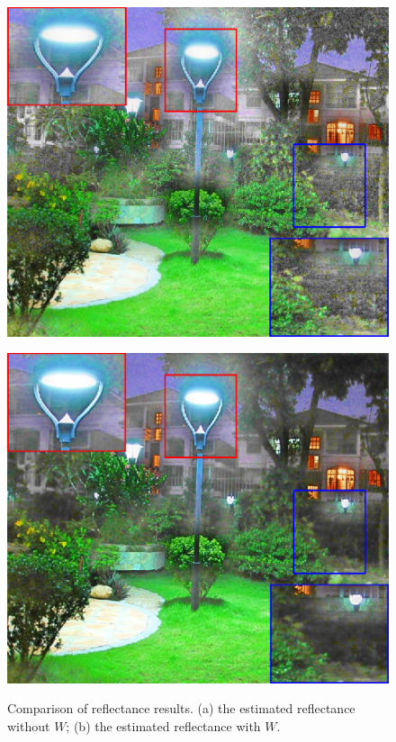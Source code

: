 \begin{figure}[t]
\centering
\begin{minipage}[b]{0.49\hsize}
\centering
\includegraphics[height=0.65\hsize]{images/noise/mlv_wo.eps}
 \label{fig:wo}
\end{minipage}
\begin{minipage}[b]{0.49\hsize}
\centering
\includegraphics[height=0.65\hsize]{images/noise/mlv_reflectance.eps}
 \label{fig:w}
\end{minipage}
\caption{Comparison of reflectance results. (a) the estimated reflectance without $W$; (b) the estimated reflectance with $W$.}
\label{fig:adaptive/effectiveness}
\end{figure}

